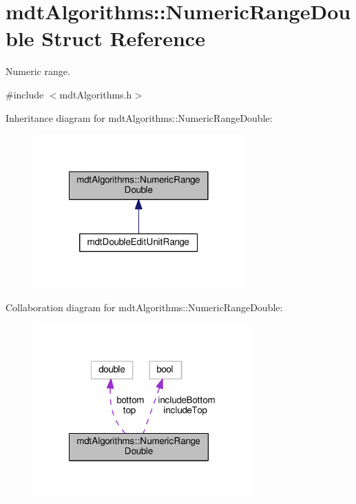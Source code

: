 \hypertarget{structmdt_algorithms_1_1_numeric_range_double}{\section{mdt\-Algorithms\-:\-:Numeric\-Range\-Double Struct Reference}
\label{structmdt_algorithms_1_1_numeric_range_double}
}


Numeric range.  




{\ttfamily \#include $<$mdt\-Algorithms.\-h$>$}



Inheritance diagram for mdt\-Algorithms\-:\-:Numeric\-Range\-Double\-:
\nopagebreak
\begin{figure}[H]
\begin{center}
\leavevmode
\includegraphics[width=230pt]{structmdt_algorithms_1_1_numeric_range_double__inherit__graph}
\end{center}
\end{figure}


Collaboration diagram for mdt\-Algorithms\-:\-:Numeric\-Range\-Double\-:
\nopagebreak
\begin{figure}[H]
\begin{center}
\leavevmode
\includegraphics[width=239pt]{structmdt_algorithms_1_1_numeric_range_double__coll__graph}
\end{center}
\end{figure}

